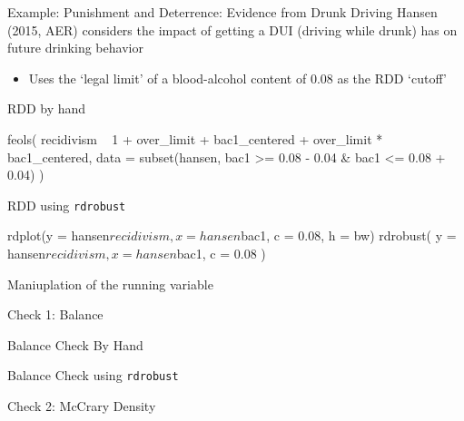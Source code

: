 \documentclass[aspectratio=169,t,11pt,table]{beamer}
\begin{document}
\begin{frame}{Example: Punishment and Deterrence: Evidence from Drunk Driving}
  Hansen (2015, AER) considers the impact of getting a DUI (driving while drunk) has on future drinking behavior
  \begin{itemize}
    \item Uses the `legal limit' of a blood-alcohol content of 0.08 as the RDD `cutoff'
  \end{itemize}
\end{frame}


\begin{frame}[fragile]{RDD by hand}{}
	\begin{codeblock}
feols(
  recidivism ~ 1 + over_limit + bac1_centered + over_limit * bac1_centered,
  data = subset(hansen, bac1 >= 0.08 - 0.04 & bac1 <= 0.08 + 0.04)
)
	\end{codeblock}
\end{frame}

\begin{frame}[fragile]{RDD using \texttt{rdrobust}}{}
	\begin{codeblock}
rdplot(y = hansen$recidivism, x = hansen$bac1, c = 0.08, h = bw)
rdrobust(
  y = hansen$recidivism, x = hansen$bac1, c = 0.08
)
	\end{codeblock}
\end{frame}

\begin{frame}{Maniuplation of the running variable}{}

\end{frame}

\begin{frame}{Check 1: Balance}{}

\end{frame}

\begin{frame}[fragile]{Balance Check By Hand}{}
	\begin{codeblock}
	\end{codeblock}
\end{frame}

\begin{frame}[fragile]{Balance Check using \texttt{rdrobust}}{}
	\begin{codeblock}
	\end{codeblock}
\end{frame}

\begin{frame}{Check 2: McCrary Density}{}

\end{frame}
\end{document}
